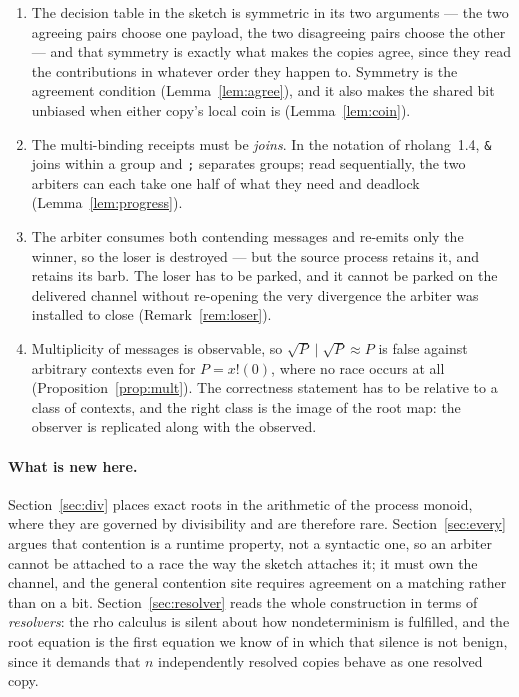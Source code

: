 \documentclass[11pt]{article}
\theoremstyle{definition}
\newcommand{\rhoc}{rho calculus}
\newcommand{\rt}[1]{\sqrt{#1}}
\begin{document}
\begin{enumerate}
\item The decision table in the sketch is symmetric in its two arguments --- the two agreeing pairs choose one payload, the two disagreeing pairs choose the other --- and that symmetry is exactly what makes the copies agree, since they read the contributions in whatever order they happen to. Symmetry is the agreement condition (Lemma~\ref{lem:agree}), and it also makes the shared bit unbiased when either copy's local coin is (Lemma~\ref{lem:coin}).
\item The multi-binding receipts must be \emph{joins}. In the notation of rholang~1.4, \texttt{\&} joins within a group and \texttt{;} separates groups; read sequentially, the two arbiters can each take one half of what they need and deadlock (Lemma~\ref{lem:progress}).
\item The arbiter consumes both contending messages and re-emits only the winner, so the loser is destroyed --- but the source process retains it, and retains its barb. The loser has to be parked, and it cannot be parked on the delivered channel without re-opening the very divergence the arbiter was installed to close (Remark~\ref{rem:loser}).
\item Multiplicity of messages is observable, so $\rt{P} \mid \rt{P} \approx P$ is false against arbitrary contexts even for $P = x!(0)$, where no race occurs at all (Proposition~\ref{prop:mult}). The correctness statement has to be relative to a class of contexts, and the right class is the image of the root map: the observer is replicated along with the observed.
\end{enumerate}

\paragraph{What is new here.} Section~\ref{sec:div} places exact roots in the arithmetic of the process monoid, where they are governed by divisibility and are therefore rare. Section~\ref{sec:every} argues that contention is a runtime property, not a syntactic one, so an arbiter cannot be attached to a race the way the sketch attaches it; it must own the channel, and the general contention site requires agreement on a matching rather than on a bit. Section~\ref{sec:resolver} reads the whole construction in terms of \emph{resolvers}: the \rhoc{} is silent about how nondeterminism is fulfilled, and the root equation is the first equation we know of in which that silence is not benign, since it demands that $n$ independently resolved copies behave as one resolved copy.
\end{document}
